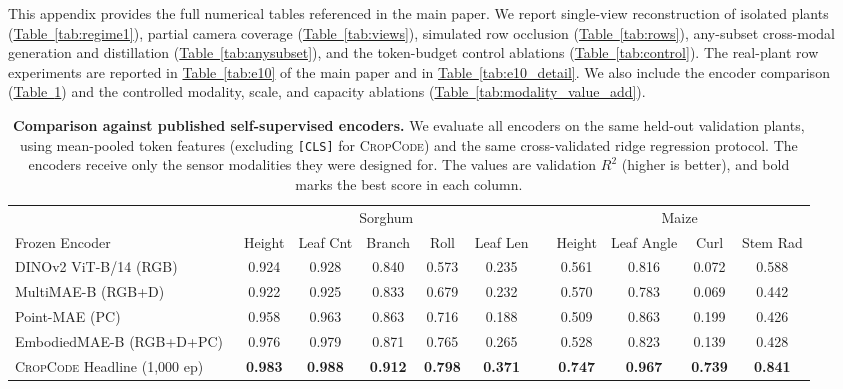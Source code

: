 \documentclass[10pt,twocolumn,letterpaper]{article}
\newcommand{\tabref}[1]{\hyperref[#1]{Table~\ref*{#1}}}
\newcommand{\method}{\textup{\textsc{CropCode}}}   %
\providecommand{\CropCode}{\textsc{CropCode}}
\begin{document}
This appendix provides the full numerical tables referenced in the main paper. We report single-view reconstruction of isolated plants (\tabref{tab:regime1}), partial camera coverage (\tabref{tab:views}), simulated row occlusion (\tabref{tab:rows}), any-subset cross-modal generation and distillation (\tabref{tab:anysubset}), and the token-budget control ablations (\tabref{tab:control}). The real-plant row experiments are reported in \tabref{tab:e10} of the main paper and in \tabref{tab:e10_detail}. We also include the encoder comparison (\tabref{tab:baselines}) and the controlled modality, scale, and capacity ablations (\tabref{tab:modality_value_add}).

\begin{table}[t]
  \caption{\textbf{Comparison against published self-supervised encoders.} We evaluate all encoders on the same held-out validation plants, using mean-pooled token features (excluding \texttt{[CLS]} for \method{}) and the same cross-validated ridge regression protocol. The encoders receive only the sensor modalities they were designed for. The values are validation $R^2$ (higher is better), and bold marks the best score in each column.}
  \label{tab:e8}\label{tab:baselines}
  \centering\scriptsize
  \setlength{\tabcolsep}{2.6pt}
  \begin{tabular}{l ccc cc c cccc}
    \toprule
    & \multicolumn{5}{c}{Sorghum} & & \multicolumn{4}{c}{Maize} \\
    \cmidrule(lr){2-6}\cmidrule(lr){8-11}
    Frozen Encoder & Height & Leaf Cnt & Branch & Roll & Leaf Len & & Height & Leaf Angle & Curl & Stem Rad \\
    \midrule
    DINOv2 ViT-B/14 (RGB)~\cite{oquab2024dinov2} & 0.924 & 0.928 & 0.840 & 0.573 & 0.235 & & 0.561 & 0.816 & 0.072 & 0.588 \\
    MultiMAE-B (RGB+D)~\cite{bachmann2022multimae} & 0.922 & 0.925 & 0.833 & 0.679 & 0.232 & & 0.570 & 0.783 & 0.069 & 0.442 \\
    Point-MAE (PC)~\cite{pang2022pointmae} & 0.958 & 0.963 & 0.863 & 0.716 & 0.188 & & 0.509 & 0.863 & 0.199 & 0.426 \\
    EmbodiedMAE-B (RGB+D+PC)~\cite{dong2025embodiedmae} & 0.976 & 0.979 & 0.871 & 0.765 & 0.265 & & 0.528 & 0.823 & 0.139 & 0.428 \\
    \CropCode{} Headline (1{,}000 ep) & \textbf{0.983} & \textbf{0.988} & \textbf{0.912} & \textbf{0.798} & \textbf{0.371} & & \textbf{0.747} & \textbf{0.967} & \textbf{0.739} & \textbf{0.841} \\
    \bottomrule
  \end{tabular}
\end{table}
\end{document}
